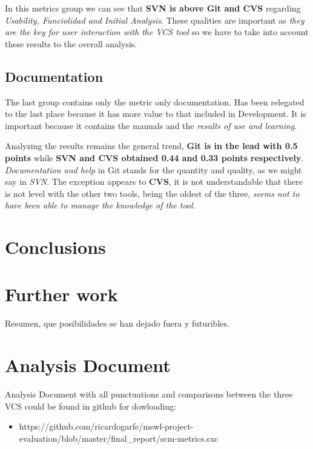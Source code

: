 \documentclass[11pt]{scrartcl}
\begin{document}
\par In this metrics group we can see that \textbf{SVN is above Git and CVS} regarding \emph{Usability, Funciolidad and Initial Analysis}. These qualities are important as \emph{they are the key for user interaction with the VCS tool} so we have to take into account these results to the overall analysis.

\subsection{Documentation}

\par The last group contains only the metric only documentation. Has been relegated to the last place because it has more value to that included in Development. It is important because it contains the manuals and the \emph{results of use and learning}.

\par Analyzing the results remains the general trend, \textbf{Git is in the lead with 0.5 points} while \textbf{SVN and CVS obtained 0.44 and 0.33 points respectively}. \emph{Documentation and help} in Git stands for the quantity and quality, as we might say in \emph{SVN}. The exception appears to \textbf{CVS}, it is not understandable that there is not level with the other two tools, being the oldest of the three, \emph{seems not to have been able to manage the knowledge of the tool}.

\section{Conclusions}

\section{Further work}

Resumen, que posibilidades se han dejado fuera y futuribles.

\section{Analysis Document}

Analysis Document with all punctuations and comparisons between the three VCS could be found in github for dowloading:
\begin{itemize}
    \item https://github.com/ricardogarfe/mswl-project-evaluation/blob/master/final\_report/scm-metrics.sxc
\end{itemize}
\end{document}
